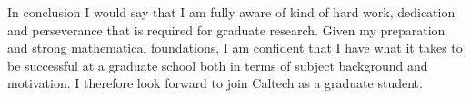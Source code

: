 \documentclass[11pt]{article}
\begin{document}
\medskip
In conclusion I would say that I am fully aware of kind of hard work, dedication and perseverance that is required for graduate research. Given my preparation and strong mathematical foundations,  I am confident that I have what it takes to be successful at a graduate school both in terms of subject background and motivation. I therefore look forward to join Caltech as a graduate student.
\end{document}
